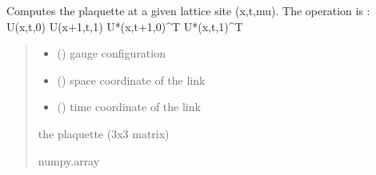 \documentclass[letterpaper,10pt,english]{sphinxmanual}
\begin{document}

\begin{fulllineitems}
\label{\detokenize{gauge_su3:gauge_su3.calculate_plaquette}}
\pysigstartsignatures
\pysiglinewithargsret
{}
{\sphinxparamcomma {}\sphinxparamcomma {}}
{}
\pysigstopsignatures
\sphinxAtStartPar
Computes the plaquette at a given lattice site (x,t,mu). The operation is : U(x,t,0) U(x+1,t,1) U*(x,t+1,0)\textasciicircum{}T U*(x,t,1)\textasciicircum{}T
\begin{quote}\begin{description}
\begin{itemize}
\item {} 
\sphinxAtStartPar
{} () \textendash{} gauge configuration

\item {} 
\sphinxAtStartPar
{} () \textendash{} space coordinate of the link

\item {} 
\sphinxAtStartPar
{} () \textendash{} time coordinate of the link

\end{itemize}

\sphinxAtStartPar
the plaquette (3x3 matrix)

\sphinxAtStartPar
numpy.array

\end{description}\end{quote}

\end{fulllineitems}

\end{document}

